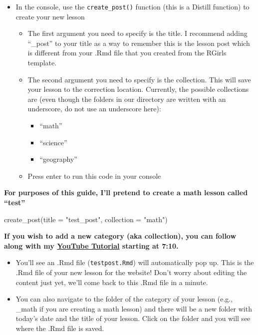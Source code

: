 \documentclass[
]{article}
\newenvironment{Shaded}{\begin{snugshade}}{\end{snugshade}}
\newcommand{\AttributeTok}[1]{\textcolor[rgb]{0.77,0.63,0.00}{#1}}
\newcommand{\FunctionTok}[1]{\textcolor[rgb]{0.00,0.00,0.00}{#1}}
\newcommand{\NormalTok}[1]{#1}
\newcommand{\StringTok}[1]{\textcolor[rgb]{0.31,0.60,0.02}{#1}}
\providecommand{\tightlist}{%
  \setlength{\itemsep}{0pt}\setlength{\parskip}{0pt}}
\begin{document}
\begin{itemize}
\item
  In the console, use the \texttt{create\_post()} function (this is a
  Distill function) to create your new lesson

  \begin{itemize}
  \item
    The first argument you need to specify is the title. I recommend
    adding ``\_post'' to your title as a way to remember this is the
    lesson post which is different from your .Rmd file that you created
    from the RGirls template.
  \item
    The second argument you need to specify is the collection. This will
    save your lesson to the correction location. Currently, the possible
    collections are (even though the folders in our directory are
    written with an underscore, do not use an underscore here):

    \begin{itemize}
    \tightlist
    \item
      ``math''
    \item
      ``science''
    \item
      ``geography''
    \end{itemize}
  \item
    Press enter to run this code in your console
  \end{itemize}
\end{itemize}

\textbf{For purposes of this guide, I'll pretend to create a math lesson
called ``test''}

\begin{Shaded}
\begin{Highlighting}[]
\FunctionTok{create\_post}\NormalTok{(}\AttributeTok{title =} \StringTok{"test\_post"}\NormalTok{, }\AttributeTok{collection =} \StringTok{"math"}\NormalTok{)}
\end{Highlighting}
\end{Shaded}

\textbf{If you wish to add a new category (aka collection), you can
follow along with my
\href{https://www.youtube.com/watch?v=b7TLIX6z1JQ}{YouTube Tutorial}
starting at 7:10.}

\begin{itemize}
\item
  You'll see an .Rmd file (\texttt{testpost.Rmd}) will automatically pop
  up. This is the .Rmd file of your new lesson for the website! Don't
  worry about editing the content just yet, we'll come back to this .Rmd
  file in a minute.
\item
  You can also navigate to the folder of the category of your lesson
  (e.g., \_math if you are creating a math lesson) and there will be a
  new folder with today's date and the title of your lesson. Click on
  the folder and you will see where the .Rmd file is saved.
\end{itemize}
\end{document}
